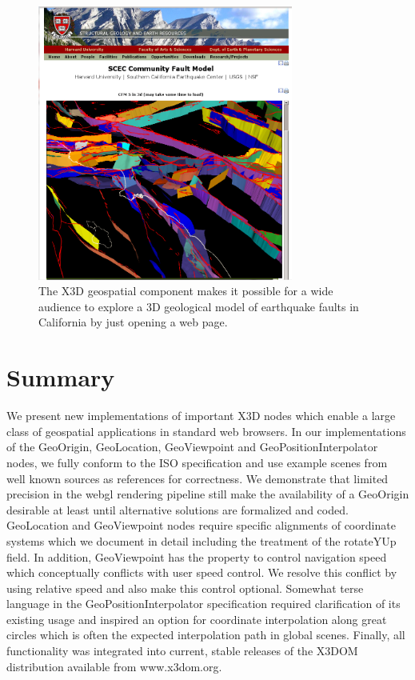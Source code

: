 \documentclass{acmsiggraph}                     %
\begin{document}
\begin{figure}[htbp] \centering \includegraphics[width=3.3in]{Application_SCEC.png} \caption{The X3D
  geospatial component makes it possible for a wide audience to explore a 3D geological model of
earthquake faults in California by just opening a web page.} \label{fig:Application_SCEC.png}
\end{figure}



\section{Summary}

We present new implementations of important X3D nodes which enable a large class of geospatial
applications in standard web browsers. In our implementations of the GeoOrigin, GeoLocation,
GeoViewpoint and GeoPositionInterpolator nodes, we fully conform to the ISO specification and use
example scenes from well known sources as references for correctness. We demonstrate that limited
precision in the webgl rendering pipeline still make the availability of a GeoOrigin desirable at
least until alternative solutions are formalized and coded. GeoLocation and GeoViewpoint nodes
require specific alignments of coordinate systems which we document in detail including the
treatment of the rotateYUp field. In addition, GeoViewpoint has the property to control navigation
speed which conceptually conflicts with user speed control. We resolve this conflict by using
relative speed and also make this control optional. Somewhat terse language in the
GeoPositionInterpolator specification required clarification of its existing usage and inspired an
option for coordinate interpolation along great circles which is often the expected interpolation
path in global scenes. Finally, all functionality was integrated into current, stable releases of
the X3DOM distribution available from www.x3dom.org.







 \nocite{*} 
\end{document}
